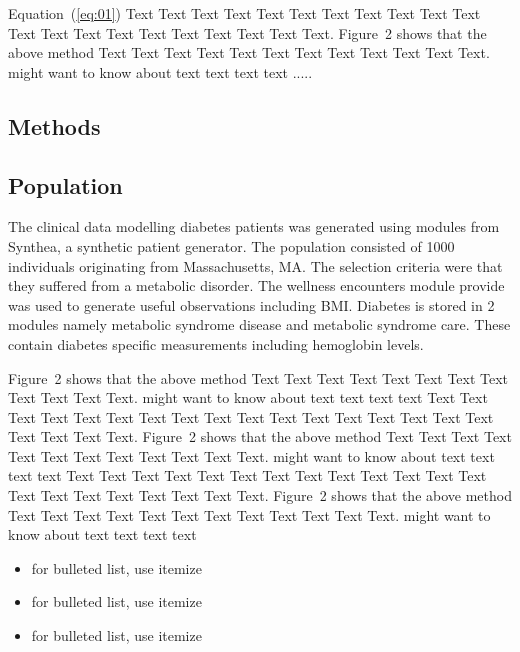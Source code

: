 \documentclass{bioinfo}
\begin{document}
Equation~(\ref{eq:01}) Text Text Text Text Text Text  Text Text
Text Text Text Text Text Text Text Text Text Text Text Text Text.
Figure~2\vphantom{\ref{fig:02}} shows that the above method  Text
Text Text Text  Text Text Text Text Text Text  Text Text.
\citealp{Boffelli03} might want to know about text text text text
.....


\begin{methods}
\section{Methods}
\subsection{Population}
The clinical data modelling diabetes patients was generated using modules from Synthea, a synthetic patient generator. The population consisted of 1000 individuals originating from Massachusetts, MA. The selection criteria were that they suffered from a metabolic disorder. The wellness encounters module provide was used to generate useful observations including BMI. Diabetes is stored in 2 modules namely metabolic syndrome disease and metabolic syndrome care. These contain diabetes specific measurements including hemoglobin levels. 

Figure~2\vphantom{\ref{fig:02}} shows that the above method  Text
Text Text Text  Text Text Text Text Text Text  Text Text.
\citealp{Boffelli03} might want to know about  text text text text
Text Text Text Text Text Text Text Text Text Text Text Text Text
Text Text  Text Text Text Text Text Text.
Figure~2\vphantom{\ref{fig:02}} shows that the above method  Text
Text Text Text Text Text Text Text Text Text  Text Text.
\citealp{Boffelli03} might want to know about text text text text
Text Text Text Text Text Text  Text Text Text Text Text Text Text
Text Text Text Text Text Text Text Text.
Figure~2\vphantom{\ref{fig:02}} shows that the above method  Text
Text Text Text Text Text Text Text Text Text  Text Text.
\citealp{Boffelli03} might want to know about text text text
text\vspace*{1pt}

\begin{itemize}
\item for bulleted list, use itemize
\item for bulleted list, use itemize
\item for bulleted list, use itemize\vspace*{1pt}
\end{itemize}


\end{methods}
\end{document}
